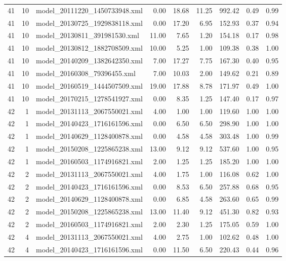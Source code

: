 \begin{table}[ht]
\begin{tabular}{rrlrrrrrr}
   41 &  10 & model\_20111220\_1450733948.xml & 0.00 & 18.68 & 11.25 & 992.42 & 0.49 & 0.99 \\ 
   41 &  10 & model\_20130725\_1929838118.xml & 0.00 & 17.20 & 6.95 & 152.93 & 0.37 & 0.94 \\ 
   41 &  10 & model\_20130811\_391981530.xml & 11.00 & 7.65 & 1.20 & 154.18 & 0.17 & 0.98 \\ 
   41 &  10 & model\_20130812\_1882708509.xml & 10.00 & 5.25 & 1.00 & 109.38 & 0.38 & 1.00 \\ 
   41 &  10 & model\_20140209\_1382642350.xml & 7.00 & 17.27 & 7.75 & 167.30 & 0.40 & 0.95 \\ 
   41 &  10 & model\_20160308\_79396455.xml & 7.00 & 10.03 & 2.00 & 149.62 & 0.21 & 0.89 \\ 
   41 &  10 & model\_20160519\_1444507509.xml & 19.00 & 17.88 & 8.78 & 171.97 & 0.49 & 1.00 \\ 
   41 &  10 & model\_20170215\_1278541927.xml & 0.00 & 8.35 & 1.25 & 147.40 & 0.17 & 0.97 \\ 
   42 &   1 & model\_20131113\_2067550021.xml & 4.00 & 1.00 & 1.00 & 119.60 & 1.00 & 1.00 \\ 
   42 &   1 & model\_20140423\_1716161596.xml & 0.00 & 6.50 & 6.50 & 298.90 & 1.00 & 1.00 \\ 
   42 &   1 & model\_20140629\_1128400878.xml & 0.00 & 4.58 & 4.58 & 303.48 & 1.00 & 0.99 \\ 
   42 &   1 & model\_20150208\_1225865238.xml & 13.00 & 9.12 & 9.12 & 537.60 & 1.00 & 0.95 \\ 
   42 &   1 & model\_20160503\_1174916821.xml & 2.00 & 1.25 & 1.25 & 185.20 & 1.00 & 1.00 \\ 
   42 &   2 & model\_20131113\_2067550021.xml & 4.00 & 1.75 & 1.00 & 116.08 & 0.62 & 1.00 \\ 
   42 &   2 & model\_20140423\_1716161596.xml & 0.00 & 8.53 & 6.50 & 257.88 & 0.68 & 0.95 \\ 
   42 &   2 & model\_20140629\_1128400878.xml & 0.00 & 6.85 & 4.58 & 263.60 & 0.65 & 0.99 \\ 
   42 &   2 & model\_20150208\_1225865238.xml & 13.00 & 11.40 & 9.12 & 451.30 & 0.82 & 0.93 \\ 
   42 &   2 & model\_20160503\_1174916821.xml & 2.00 & 2.30 & 1.25 & 175.05 & 0.59 & 1.00 \\ 
   42 &   4 & model\_20131113\_2067550021.xml & 4.00 & 2.75 & 1.00 & 102.62 & 0.48 & 1.00 \\ 
   42 &   4 & model\_20140423\_1716161596.xml & 0.00 & 11.50 & 6.50 & 220.43 & 0.44 & 0.96 \\ 

\end{tabular}
\end{table}
